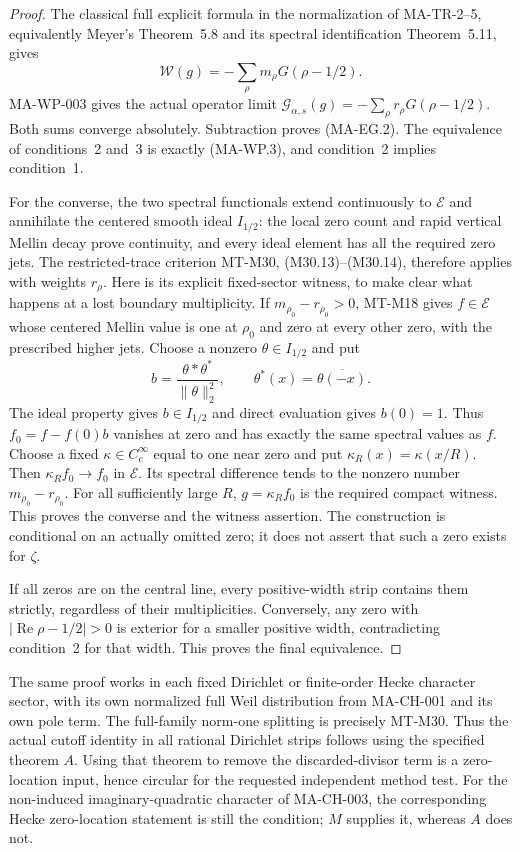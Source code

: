 \begin{proof}
The classical full explicit formula in the normalization of
MA-TR-2--5, equivalently Meyer's Theorem~5.8 and its spectral
identification Theorem~5.11, gives
\[
             \mathcal W(g)=-\sum_\rho m_\rho G(\rho-1/2).
\]
MA-WP-003 gives the actual operator limit
$\mathcal G_{\alpha,s}(g)=-\sum_\rho r_\rho G(\rho-1/2)$.
Both sums converge absolutely. Subtraction proves (MA-EG.2).
The equivalence of conditions~2 and~3 is exactly (MA-WP.3),
and condition~2 implies condition~1.

For the converse, the two spectral functionals extend continuously
to $\mathcal E$ and annihilate the centered smooth ideal
$I_{1/2}$: the local zero count and rapid vertical Mellin decay
prove continuity, and every ideal element has all the required
zero jets. The restricted-trace criterion MT-M30, (M30.13)--(M30.14),
therefore applies with weights $r_\rho$.
Here is its explicit fixed-sector witness, to make clear what
happens at a lost boundary multiplicity. If
$m_{\rho_0}-r_{\rho_0}>0$, MT-M18 gives $f\in\mathcal E$
whose centered Mellin value is one at $\rho_0$ and zero at every
other zero, with the prescribed higher jets. Choose a nonzero
$\theta\in I_{1/2}$ and put
\[
 b=\frac{\theta*\theta^*}{\|\theta\|_2^2},\qquad
 \theta^*(x)=\overline{\theta(-x)}.
\]
The ideal property gives $b\in I_{1/2}$ and direct evaluation
gives $b(0)=1$. Thus $f_0=f-f(0)b$ vanishes at zero and has
exactly the same spectral values as $f$. Choose a fixed
$\kappa\in C_c^\infty$ equal to one near zero and put
$\kappa_R(x)=\kappa(x/R)$. Then
$\kappa_R f_0\to f_0$ in $\mathcal E$. Its spectral difference
tends to the nonzero number $m_{\rho_0}-r_{\rho_0}$.
For all sufficiently large $R$, $g=\kappa_R f_0$ is the required
compact witness. This proves the converse and the witness assertion.
The construction is conditional on an actually omitted zero;
it does not assert that such a zero exists for $\zeta$.

If all zeros are on the central line, every positive-width
strip contains them strictly, regardless of their multiplicities.
Conversely, any zero with $|\operatorname{Re}\rho-1/2|>0$
is exterior for a smaller positive width, contradicting
condition~2 for that width. This proves the final equivalence.
\end{proof}

The same proof works in each fixed Dirichlet or finite-order Hecke
character sector, with its own normalized full Weil distribution
from MA-CH-001 and its own pole term. The full-family norm-one
splitting is precisely MT-M30. Thus the actual cutoff identity in
all rational Dirichlet strips follows using the specified theorem
$A$. Using that theorem to remove the discarded-divisor term is
a zero-location input, hence circular for the requested independent
method test. For the non-induced imaginary-quadratic character of
MA-CH-003, the corresponding Hecke zero-location statement is still
the condition; $M$ supplies it, whereas $A$ does not.

